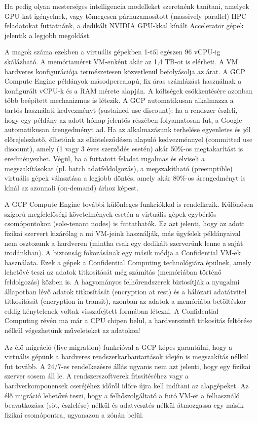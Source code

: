 \documentclass[
]{article}
\begin{document}
Ha pedig olyan mesterséges intelligencia modelleket szeretnénk tanítani,
amelyek GPU-kat igényelnek, vagy tömegesen párhuzamosított (massively
parallel) HPC feladatokat futtatnánk, a dedikált NVIDIA GPU-kkal kínált
Accelerator gépek jelentik a legjobb megoldást.

A magok száma ezekben a virtuális gépekben 1-től egészen 96 vCPU-ig
skálázható. A memóriaméret VM-enként akár az 1,4 TB-ot is elérheti. A VM
hardveres konfigurációja természetesen közvetlenül befolyásolja az árat.
A GCP Compute Engine példányok másodpercalapú, fix áras számlázást
használnak a konfigurált vCPU-k és a RAM mérete alapján. A költségek
csökkentésére azonban több beépített mechanizmus is létezik. A GCP
automatikusan alkalmazza a tartós használati kedvezményt (sustained use
discount): ha a rendszer észleli, hogy egy példány az adott hónap
jelentős részében folyamatosan fut, a Google automatikusan árengedményt
ad. Ha az alkalmazásunk terhelése egyenletes és jól előrejelezhető,
élhetünk az elköteleződésen alapuló kedvezménnyel (committed use
discount), amely (1 vagy 3 éves szerződés esetén) akár 50\%-os
megtakarítást is eredményezhet. Végül, ha a futtatott feladat rugalmas
és elviseli a megszakításokat (pl. batch adatfeldolgozás), a
megszakítható (preemptible) virtuális gépek választása a legjobb döntés,
amely akár 80\%-os árengedményt is kínál az azonnali (on-demand) árhoz
képest.

A GCP Compute Engine további különleges funkciókkal is rendelkezik.
Különösen szigorú megfelelőségi követelmények esetén a virtuális gépek
egybérlős csomópontokon (sole-tenant nodes) is futtathatók. Ez azt
jelenti, hogy az adott fizikai szervert kizárólag a mi VM-jeink
használják, más ügyfelek példányaival nem osztozunk a hardveren (mintha
csak egy dedikált szerverünk lenne a saját irodánkban). A biztonság
fokozásának egy másik módja a Confidential VM-ek használata. Ezek a
gépek a Confidential Computing technológiára épülnek, amely lehetővé
teszi az adatok titkosítását még számítás (memóriában történő
feldolgozás) közben is. A hagyományos felhőrendszerek biztosítják a
nyugalmi állapotban lévő adatok titkosítását (encryption at rest) és a
hálózati adatátvitel titkosítását (encryption in transit), azonban az
adatok a memóriába betöltéskor eddig kénytelenek voltak visszafejtett
formában létezni. A Confidential Computing révén ma már a CPU chipen
belül, a hardverszintű titkosítás feltörése nélkül végezhetünk
műveleteket az adatokon!

Az élő migráció (live migration) funkcióval a GCP képes garantálni, hogy
a virtuális gépünk a hardveres rendszerkarbantartások idején is
megszakítás nélkül fut tovább. A 24/7-es rendelkezésre állás ugyanis nem
azt jelenti, hogy egy fizikai szerver sosem áll le. A rendszerszoftverek
frissítéséhez vagy a hardverkomponensek cseréjéhez időről időre újra
kell indítani az alapgépeket. Az élő migráció lehetővé teszi, hogy a
felhőszolgáltató a futó VM-et a felhasználó beavatkozása (sőt,
észlelése) nélkül és adatvesztés nélkül átmozgassa egy másik fizikai
csomópontra, ugyanazon a zónán belül.
\end{document}
